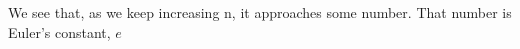 \documentclass[preview]{standalone}
\begin{document}
\begin{center}
We see that, as we keep increasing n, it approaches some number. That number is Euler's constant, $e$
\end{center}
\end{document}
